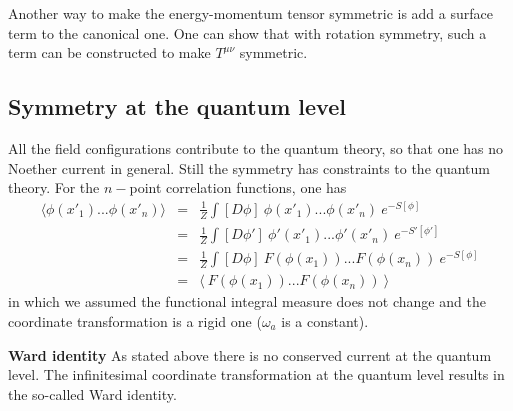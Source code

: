 \documentclass[submission, PhysLectNotes]{SciPost}
\begin{document}
Another way to make the energy-momentum tensor symmetric is add a surface term to the canonical one. One can show that with rotation symmetry, such a term can be constructed to make $T^{\mu\nu}$ symmetric.

\subsection{Symmetry at the quantum level}
All the field configurations contribute to the quantum theory, so that one has no Noether current in general. Still the symmetry has constraints to the quantum theory. For the $n-$point correlation functions, one has
\begin{eqnarray}
\langle \phi(x'_1)...\phi(x'_n) \rangle &=& \frac{1}{Z}\int [D\phi]\ \phi(x'_1)...\phi(x'_n) \ e^{-S[\phi]} \\
&=& \frac{1}{Z}\int [D\phi']\ \phi'(x'_1)...\phi'(x'_n) \ e^{-S'[\phi']} \\
&=& \frac{1}{Z}\int [D\phi]\ F(\phi(x_1))...F(\phi(x_n)) \ e^{-S[\phi]} \\
&=& \langle\ F(\phi(x_1))...F(\phi(x_n)) \ \rangle
\end{eqnarray}
in which we assumed the functional integral measure does not change and the coordinate transformation is a rigid one ($\omega_a$ is a constant).

{\bf Ward identity}
As stated above there is no conserved current at the quantum level. The infinitesimal coordinate transformation at the quantum level results in the so-called Ward identity.
\end{document}
